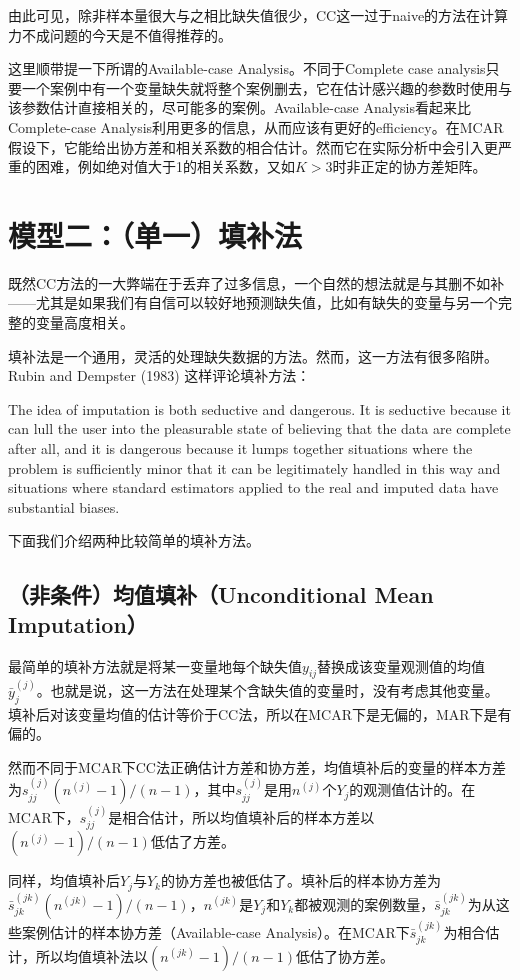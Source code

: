 \documentclass[aps,pre,12pt,preprint,onecolumn,showpacs,showkeys,AutoFakeBold]{revtex4-1}
\begin{document}
    由此可见，除非样本量很大与之相比缺失值很少，CC这一过于naive的方法在计算力不成问题的今天是不值得推荐的。

    这里顺带提一下所谓的Available-case Analysis。不同于Complete case analysis只要一个案例中有一个变量缺失就将整个案例删去，它在估计感兴趣的参数时使用与该参数估计直接相关的，尽可能多的案例。Available-case Analysis看起来比Complete-case Analysis利用更多的信息，从而应该有更好的efficiency。在MCAR假设下，它能给出协方差和相关系数的相合估计。然而它在实际分析中会引入更严重的困难，例如绝对值大于1的相关系数，又如$K>3$时非正定的协方差矩阵。

\section{模型二：（单一）填补法}\label{sec:mean_imputation}
    既然CC方法的一大弊端在于丢弃了过多信息，一个自然的想法就是与其删不如补——尤其是如果我们有自信可以较好地预测缺失值，比如有缺失的变量与另一个完整的变量高度相关。

    填补法是一个通用，灵活的处理缺失数据的方法。然而，这一方法有很多陷阱。Rubin and Dempster (1983) 这样评论填补方法：

    The idea of imputation is both seductive and dangerous. It is seductive because it can lull the user into the pleasurable state of believing that the data are complete after all, and it is dangerous because it lumps together situations where the problem is sufficiently minor that it can be legitimately handled in this way and situations where standard estimators applied to the real and imputed data have substantial biases.

    下面我们介绍两种比较简单的填补方法。
    \subsection{（非条件）均值填补（Unconditional Mean Imputation）}
    最简单的填补方法就是将某一变量地每个缺失值$y_{ij}$替换成该变量观测值的均值$\bar y_j ^{(j)}$。也就是说，这一方法在处理某个含缺失值的变量时，没有考虑其他变量。填补后对该变量均值的估计等价于CC法，所以在MCAR下是无偏的，MAR下是有偏的。

    然而不同于MCAR下CC法正确估计方差和协方差，均值填补后的变量的样本方差为$s_{jj}^{(j)} (n^{(j)}-1)/(n-1)$，其中$s_{jj}^{(j)}$是用$n^{(j)}$个$Y_j$的观测值估计的。在MCAR下，$s_{jj}^{(j)}$是相合估计，所以均值填补后的样本方差以$(n^{(j)}-1)/(n-1)$低估了方差。

    同样，均值填补后$Y_j$与$Y_k$的协方差也被低估了。填补后的样本协方差为$\bar s_{jk}^{(jk)}(n^{(jk)}-1)/(n-1)$，$n^{(jk)}$是$Y_j$和$Y_k$都被观测的案例数量，$\bar s_{jk}^{(jk)}$为从这些案例估计的样本协方差（Available-case Analysis）。在MCAR下$\bar s_{jk}^{(jk)}$为相合估计，所以均值填补法以$(n^{(jk)}-1)/(n-1)$低估了协方差。
\end{document}
